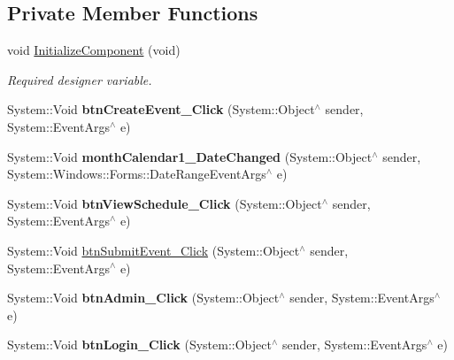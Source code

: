 \subsection*{Private Member Functions}
\begin{DoxyCompactItemize}
\item 
void \mbox{\hyperlink{class_project1_1_1_my_form_a941121d2b7db3db9d67e4f8767147046}{Initialize\+Component}} (void)
\begin{DoxyCompactList}\small\item\em Required designer variable. \end{DoxyCompactList}\item 
\mbox{\label{class_project1_1_1_my_form_aa6f66b8c7742821611eab13a365b4d73}} 
System\+::\+Void {\bfseries btn\+Create\+Event\+\_\+\+Click} (System\+::\+Object$^\wedge$ sender, System\+::\+Event\+Args$^\wedge$ e)
\item 
\mbox{\label{class_project1_1_1_my_form_a47a4b5f67a934a6a00b1e7586bd906d0}} 
System\+::\+Void {\bfseries month\+Calendar1\+\_\+\+Date\+Changed} (System\+::\+Object$^\wedge$ sender, System\+::\+Windows\+::\+Forms\+::\+Date\+Range\+Event\+Args$^\wedge$ e)
\item 
\mbox{\label{class_project1_1_1_my_form_a141acab9fc71a75dce2ce9c117b82a04}} 
System\+::\+Void {\bfseries btn\+View\+Schedule\+\_\+\+Click} (System\+::\+Object$^\wedge$ sender, System\+::\+Event\+Args$^\wedge$ e)
\item 
System\+::\+Void \mbox{\hyperlink{class_project1_1_1_my_form_a81db34ac10e4a7afe270e533d3ba370f}{btn\+Submit\+Event\+\_\+\+Click}} (System\+::\+Object$^\wedge$ sender, System\+::\+Event\+Args$^\wedge$ e)
\item 
\mbox{\label{class_project1_1_1_my_form_a70bdad1bbd625295204e5d3441a8c90f}} 
System\+::\+Void {\bfseries btn\+Admin\+\_\+\+Click} (System\+::\+Object$^\wedge$ sender, System\+::\+Event\+Args$^\wedge$ e)
\item 
\mbox{\label{class_project1_1_1_my_form_a79197b7e374e2631e3dd3485e43bd0e5}} 
System\+::\+Void {\bfseries btn\+Login\+\_\+\+Click} (System\+::\+Object$^\wedge$ sender, System\+::\+Event\+Args$^\wedge$ e)
\item 

\end{DoxyCompactItemize}
